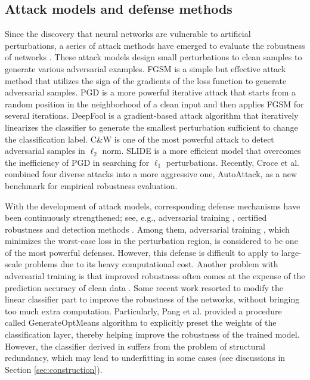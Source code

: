 \documentclass[preprint,review,12pt]{elsarticle}
\numberwithin{equation}{section}
\begin{document}
 	
	\subsection{Attack models and defense methods}
	Since the discovery that neural networks are vulnerable to artificial perturbations,
	a series of attack methods have emerged to evaluate the robustness of networks
	\cite{carlini2017,croce2020,moosavi2016,madry2018,foolbox2017,szegedy2013,tramer2019,wang2021}.
   These attack models design small perturbations to clean samples to generate various adversarial examples.
    FGSM  \cite{goodfellow2015} is a simple but effective attack method that utilizes the sign of the gradients of the loss function to generate adversarial samples.
	PGD \cite{madry2018}  is a more powerful iterative attack that starts from a random position
	in the neighborhood of a clean input and then applies FGSM for several iterations.
	DeepFool \cite{moosavi2016} is a gradient-based attack algorithm that iteratively linearizes the classifier
    to generate the smallest perturbation sufficient to change the classification label.
	C\&W \cite{carlini2017} is one of the most powerful attack to detect adversarial samples in $\ell_2$ norm.
	SLIDE \cite{tramer2019} is a more efficient model that  overcomes the inefficiency of PGD in searching for $\ell_1$ perturbations.
	Recently, Croce et al. \cite{croce2020} combined four diverse attacks into a more aggressive one, AutoAttack,
	as a new benchmark for empirical robustness evaluation.
	
	
	With the development of attack models,
    corresponding defense mechanisms have been continuously strengthened;
	see, e.g., adversarial training \cite{goodfellow2015,madry2018,wang2021,zhang2019b}, certified robustness \cite{cohen2019,gowal2019} and detection methods \cite{guo2019}.
    Among them,  adversarial training \cite{madry2018}, which minimizes the worst-case loss in the perturbation region, is considered to be one of the most powerful defenses.
	However, this defense is difficult to apply to large-scale problems due to its heavy computational cost.
	Another problem with adversarial training is that improved robustness often comes at the expense of the prediction accuracy of clean data \cite{su2018,zhang2019b}.
    Some recent work \cite{pang2018,pang2020,wan2018}  resorted to modify the linear classifier part to improve the robustness of the networks,
    without bringing too much extra computation.
	Particularly, Pang et al. \cite{pang2018,pang2020} provided a procedure called GenerateOptMeans algorithm
    to explicitly preset the weights of the classification layer,
    thereby helping improve the robustness of the trained model.
	However, the classifier derived in \cite{pang2018,pang2020} suffers from the problem of structural redundancy,
    which may lead to underfitting in some cases (see discussions in Section \ref{sec:construction}).
	
\end{document}
